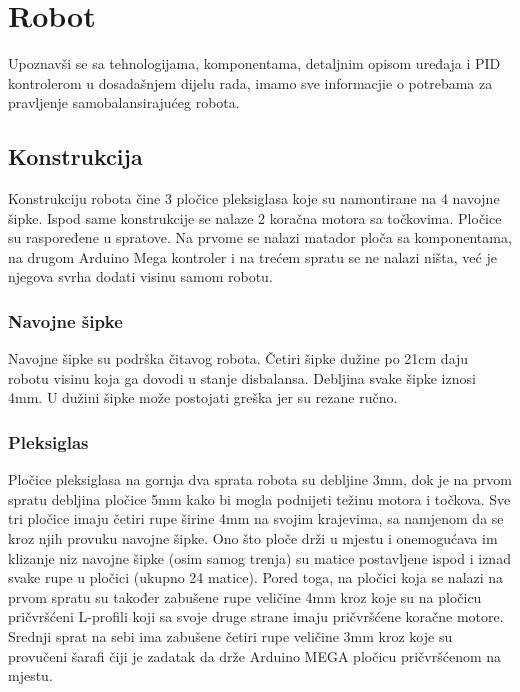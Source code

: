 \documentclass[../Document.tex]{subfiles}
\begin{document}
\section{Robot}
Upoznavši se sa tehnologijama, komponentama, detaljnim opisom uređaja i PID kontrolerom u dosadašnjem dijelu rada, imamo sve informacjie o potrebama za pravljenje samobalansirajućeg robota.

\subsection{Konstrukcija}
Konstrukciju robota čine 3 pločice pleksiglasa koje su namontirane na 4 navojne šipke. Ispod same konstrukcije se nalaze 2 koračna motora sa točkovima. Pločice su raspoređene u spratove. Na prvome se nalazi matador ploča sa komponentama, na drugom Arduino Mega kontroler i na trećem spratu se ne nalazi ništa, već je njegova svrha dodati visinu samom robotu.

\subsubsection{Navojne šipke}
Navojne šipke su podrška čitavog robota. Četiri šipke dužine po 21cm daju robotu visinu koja ga dovodi u stanje disbalansa. Debljina svake šipke iznosi 4mm. U dužini šipke može postojati greška jer su rezane ručno.


\subsubsection{Pleksiglas}
Pločice pleksiglasa na gornja dva sprata robota su debljine 3mm, dok je na prvom spratu debljina pločice 5mm kako bi mogla podnijeti težinu motora i točkova. Sve tri pločice imaju četiri rupe širine 4mm na svojim krajevima, sa namjenom da se kroz njih provuku navojne šipke. Ono što ploče drži u mjestu i onemogućava im klizanje niz navojne šipke (osim samog trenja) su matice postavljene ispod i iznad svake rupe u pločici (ukupno 24 matice). Pored toga, na pločici koja se nalazi na prvom spratu su također zabušene rupe veličine 4mm kroz koje su na pločicu pričvršćeni L-profili koji sa svoje druge strane imaju pričvršćene koračne motore. Srednji sprat na sebi ima zabušene četiri rupe veličine 3mm kroz koje su provučeni šarafi čiji je zadatak da drže Arduino MEGA pločicu pričvršćenom na mjestu.

\end{document}
